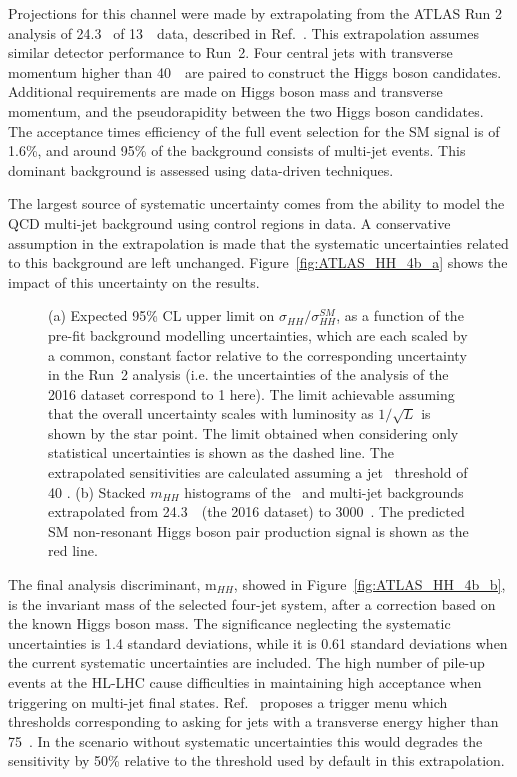 Projections for this channel were made by extrapolating from the ATLAS Run 2 analysis of 24.3 \fbinv\ of 13~\TeV\ data, described in Ref.~\cite{ITKPixelTDR}. This extrapolation assumes similar detector performance to Run~2. Four central jets with transverse momentum higher than 40~\GeV\ are paired to construct the Higgs boson candidates. Additional requirements are made on Higgs boson mass and transverse momentum, and the pseudorapidity between the two Higgs boson candidates.
The acceptance times efficiency of the full event selection for the SM signal is of 1.6\%, and around 95\% of the background consists of multi-jet events. This dominant background is assessed using data-driven techniques. 

The largest source of systematic uncertainty comes from the ability to model the QCD multi-jet background using control regions in data. A conservative assumption in the extrapolation is made that the systematic uncertainties related to this background are left unchanged. Figure~\ref{fig:ATLAS_HH_4b_a} shows the impact of this uncertainty on the results.


\begin{figure}[!htb]
\centering 
{} 
\caption{(a) Expected 95\% CL upper limit on $\sigma_{HH}/\sigma_{HH}^{SM}$, as a function of the pre-fit background modelling uncertainties, which are each scaled by a common, constant factor relative to the corresponding uncertainty in the Run~2 analysis (i.e. the uncertainties of the analysis of the 2016 dataset correspond to 1 here). 
The limit achievable assuming that the overall uncertainty scales with luminosity as $1/\sqrt L$ is shown by the star point.
The limit obtained when considering only statistical uncertainties is shown as the dashed line.
The extrapolated sensitivities are calculated assuming a jet \pt\ threshold of 40 \GeV.
(b) Stacked $m_{HH}$ histograms of the \ttbar\ and multi-jet backgrounds extrapolated from 24.3~\fbinv\ (the 2016 dataset) to 3000~\fbinv.
The predicted SM non-resonant Higgs boson pair production signal is shown as the red line.} 
\label{fig:ATLAS_HH_4b} 
\end{figure}

The final analysis discriminant, m$_{HH}$, showed in Figure~\ref{fig:ATLAS_HH_4b_b}, is the invariant mass of the selected four-jet system, after a correction based on the known Higgs boson mass. The significance neglecting the systematic uncertainties is 1.4 standard deviations, while it is 0.61 standard deviations when the current systematic uncertainties are included. 
The high number of pile-up events at the HL-LHC cause difficulties in maintaining high acceptance when triggering on multi-jet final states. Ref.~\cite{Collaboration:2285584} proposes a trigger menu which thresholds corresponding to asking for jets with a transverse energy higher than 75~\GeV. In the scenario without systematic uncertainties this would degrades the sensitivity by 50\% relative to the threshold used by default in this extrapolation.

